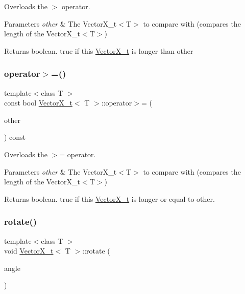 Overloads the $>$ operator. 


\begin{DoxyParams}{Parameters}
{\em other} & The Vector\+X\+\_\+t$<$\+T$>$ to compare with (compares the length of the Vector\+X\+\_\+t$<$\+T$>$)\\
\hline
\end{DoxyParams}
\begin{DoxyReturn}{Returns}
boolean. true if this \hyperlink{class_vector_x__t}{Vector\+X\+\_\+t} is longer than other 
\end{DoxyReturn}
\mbox{\label{class_vector_x__t_a5e7b917f91229508634bc8ab57a3b02c}} 
\subsubsection{\texorpdfstring{operator$>$=()}{operator>=()}}
{\footnotesize\ttfamily template$<$class T $>$ \\
const bool \hyperlink{class_vector_x__t}{Vector\+X\+\_\+t}$<$ T $>$\+::operator$>$= (\begin{DoxyParamCaption}\item[{\hyperlink{class_vector_x__t}{Vector\+X\+\_\+t}$<$ T $>$}]{other }\end{DoxyParamCaption}) const}



Overloads the $>$= operator. 


\begin{DoxyParams}{Parameters}
{\em other} & The Vector\+X\+\_\+t$<$\+T$>$ to compare with (compares the length of the Vector\+X\+\_\+t$<$\+T$>$)\\
\hline
\end{DoxyParams}
\begin{DoxyReturn}{Returns}
boolean. true if this \hyperlink{class_vector_x__t}{Vector\+X\+\_\+t} is longer or equal to other. 
\end{DoxyReturn}
\mbox{\label{class_vector_x__t_ad4e572fc98fe4d786b907598b2c8eb77}} 
\subsubsection{\texorpdfstring{rotate()}{rotate()}}
{\footnotesize\ttfamily template$<$class T $>$ \\
void \hyperlink{class_vector_x__t}{Vector\+X\+\_\+t}$<$ T $>$\+::rotate (\begin{DoxyParamCaption}\item[{T}]{angle }\end{DoxyParamCaption})}



